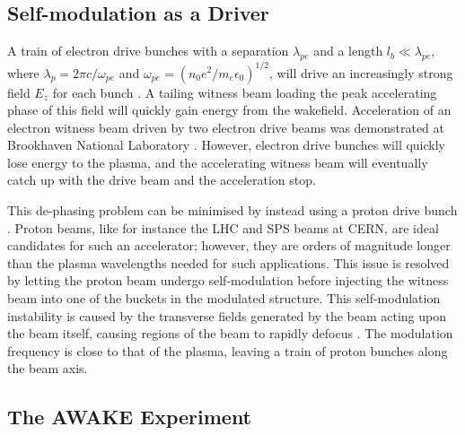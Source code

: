 \documentclass[aps,prstab,reprint,amsmath,amssymb,groupedaddress]{revtex4-1}
\begin{document}
\subsection[\label{S:I:SMI}]{Self-modulation as a Driver}

A train of electron drive bunches with a separation $\lambda_{pe}$ and a length $l_{b} \ll \lambda_{pe}$, where
$\lambda_{p} = 2\pi c/\omega_{pe}$ and $\omega_{pe} = (n_{0} e^{2} / m_{e} \epsilon_{0})^{1/2}$, will drive an
increasingly strong field $E_{z}$ for each bunch \cite{chen:1985}. A tailing witness beam loading the peak accelerating
phase of this field will quickly gain energy from the wakefield. Acceleration of an electron witness beam driven by two
electron drive beams was demonstrated at Brookhaven National Laboratory \cite{muggli:2011}. However, electron drive
bunches will quickly lose energy to the plasma, and the accelerating witness beam will eventually catch up with the
drive beam and the acceleration stop.

This de-phasing problem can be minimised by instead using a proton drive bunch \cite{caldwell:2009}. Proton beams, like
for instance the LHC and SPS beams at CERN, are ideal candidates for such an accelerator; however, they are orders of
magnitude longer than the plasma wavelengths needed for such applications. This issue is resolved by letting the proton
beam undergo self-modulation before injecting the witness beam into one of the buckets in the modulated structure. This
self-modulation instability is caused by the transverse fields generated by the beam acting upon the beam itself,
causing regions of the beam to rapidly defocus \cite{kumar:2010}. The modulation frequency is close to that of the
plasma, leaving a train of proton bunches along the beam axis.

\subsection[\label{S:I:AWAKE}]{The AWAKE Experiment}
\end{document}
